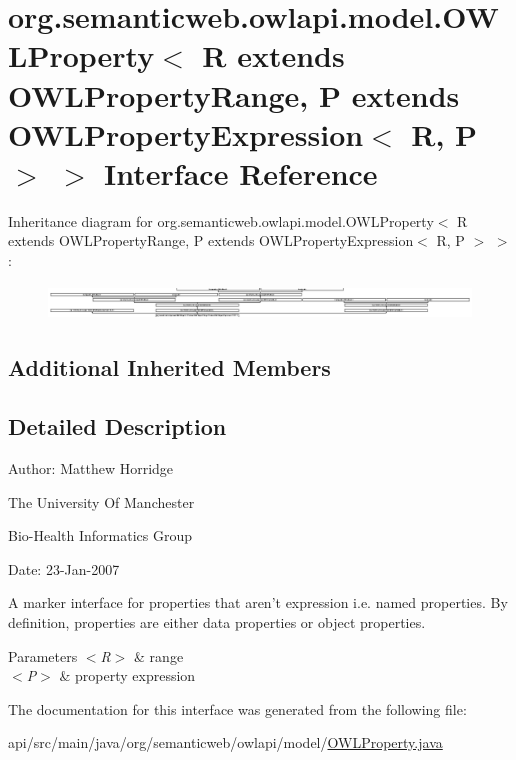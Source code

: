 \hypertarget{interfaceorg_1_1semanticweb_1_1owlapi_1_1model_1_1_o_w_l_property_3_01_r_01extends_01_o_w_l_prop80b13791851fd41214e27e841bc7d0d9}{\section{org.\-semanticweb.\-owlapi.\-model.\-O\-W\-L\-Property$<$ R extends O\-W\-L\-Property\-Range, P extends O\-W\-L\-Property\-Expression$<$ R, P $>$ $>$ Interface Reference}
\label{interfaceorg_1_1semanticweb_1_1owlapi_1_1model_1_1_o_w_l_property_3_01_r_01extends_01_o_w_l_prop80b13791851fd41214e27e841bc7d0d9}
}
Inheritance diagram for org.\-semanticweb.\-owlapi.\-model.\-O\-W\-L\-Property$<$ R extends O\-W\-L\-Property\-Range, P extends O\-W\-L\-Property\-Expression$<$ R, P $>$ $>$\-:\begin{figure}[H]
\begin{center}
\leavevmode
\includegraphics[height=0.921811cm]{interfaceorg_1_1semanticweb_1_1owlapi_1_1model_1_1_o_w_l_property_3_01_r_01extends_01_o_w_l_prop80b13791851fd41214e27e841bc7d0d9}
\end{center}
\end{figure}
\subsection*{Additional Inherited Members}


\subsection{Detailed Description}
Author\-: Matthew Horridge\par
 The University Of Manchester\par
 Bio-\/\-Health Informatics Group\par
 Date\-: 23-\/\-Jan-\/2007\par
\par


A marker interface for properties that aren't expression i.\-e. named properties. By definition, properties are either data properties or object properties. 
\begin{DoxyParams}{Parameters}
{\em $<$\-R$>$} & range \\
\hline
{\em $<$\-P$>$} & property expression \\
\hline
\end{DoxyParams}


The documentation for this interface was generated from the following file\-:\begin{DoxyCompactItemize}
\item 
api/src/main/java/org/semanticweb/owlapi/model/\hyperlink{_o_w_l_property_8java}{O\-W\-L\-Property.\-java}\end{DoxyCompactItemize}
